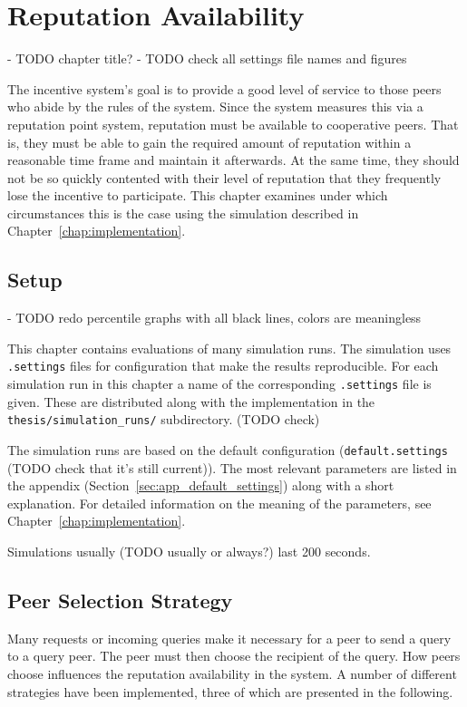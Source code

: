 \chapter{Reputation Availability}
\label{chap:rep_avail}
- TODO chapter title?
- TODO check all settings file names and figures

The incentive system's goal is to provide a good level of service to those peers
who abide by the rules of the system. Since the system measures this via a
reputation point system, reputation must be available to cooperative peers.
That is, they must be able to gain the required amount of reputation within a
reasonable time frame and maintain it afterwards. At the same time, they should
not be so quickly contented with their level of reputation that they frequently
lose the incentive to participate. This chapter examines under which
circumstances this is the case using the simulation described in
Chapter~\ref{chap:implementation}.

\section{Setup}
- TODO redo percentile graphs with all black lines, colors are meaningless

This chapter contains evaluations of many simulation runs. The simulation uses
\texttt{.settings} files for configuration that make the results reproducible.
For each simulation run in this chapter a name of the corresponding
\texttt{.settings} file is given. These are distributed along with the
implementation in the \texttt{thesis/simulation\_runs/} subdirectory. (TODO
check)

The simulation runs are based on the default configuration
(\texttt{default.settings} (TODO check that it's still current)).  The most
relevant parameters are listed in the appendix
(Section~\ref{sec:app_default_settings}) along with a short explanation. For
detailed information on the meaning of the parameters, see
Chapter~\ref{chap:implementation}.

Simulations usually (TODO usually or always?) last 200 seconds.

\section{Peer Selection Strategy}
\label{sec:selection}
Many requests or incoming queries make it necessary for a peer to send a query
to a query peer. The peer must then choose the recipient of the query. How peers
choose influences the reputation availability in the system. A number of
different strategies have been implemented, three of which are presented in the
following.

